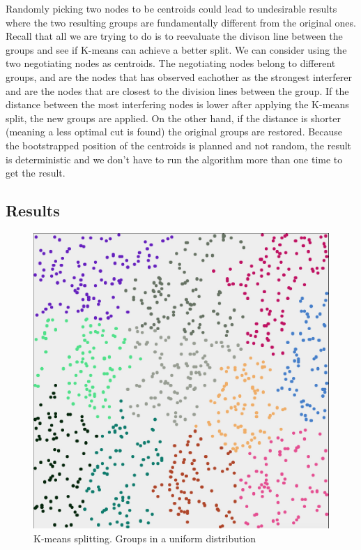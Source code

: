 Randomly picking two nodes to be centroids could lead to undesirable results where the two resulting groups are fundamentally different from the original ones. Recall that all we are trying to do is to
reevaluate the divison line between the groups and see if K-means can achieve a better split. We can consider using the two negotiating nodes as centroids. The negotiating nodes belong to different groups,
and are the nodes that has observed eachother as the strongest interferer and are the nodes that are closest to the division lines between the group. If the distance between the most interfering nodes
is lower after applying the K-means split, the new groups are applied. On the other hand, if the distance is shorter (meaning a less optimal cut is found) the original groups are restored. Because the bootstrapped
position of the centroids is planned and not random, the result is deterministic and we don't have to run the algorithm more than one time to get the result. 
%


\subsection{Results}

\begin{figure}[h]
	\center
	\includegraphics[scale=0.35]{Images/computations/KMEANS500x500_1000n.jpg}
	\caption{K-means splitting. Groups in a uniform distribution}
	\label{fig:kmeans_uniform}
\end{figure}

